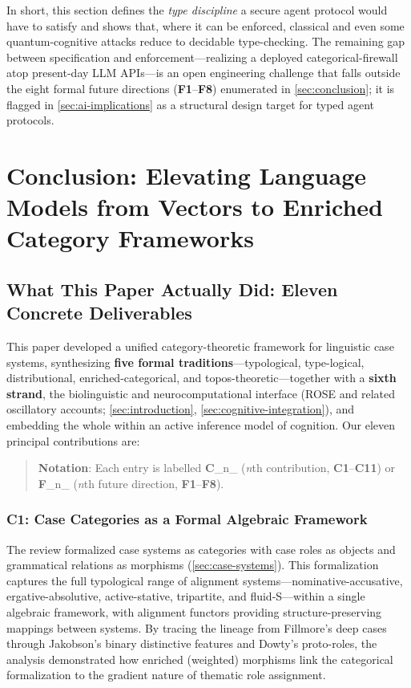 \documentclass[
]{article}
\begin{document}
In short, this section defines the \emph{type discipline} a secure agent
protocol would have to satisfy and shows that, where it can be enforced,
classical and even some quantum-cognitive attacks reduce to decidable
type-checking. The remaining gap between specification and
enforcement---realizing a deployed categorical-firewall atop present-day
LLM APIs---is an open engineering challenge that falls outside the eight
formal future directions (\textbf{F1}--\textbf{F8}) enumerated in
\autoref{sec:conclusion}; it is flagged in \autoref{sec:ai-implications}
as a structural design target for typed agent protocols.

\newpage

\section{Conclusion: Elevating Language Models from Vectors to Enriched
Category Frameworks}\label{sec:conclusion}

\subsection{What This Paper Actually Did: Eleven Concrete
Deliverables}\label{what-this-paper-actually-did-eleven-concrete-deliverables}

This paper developed a unified category-theoretic framework for
linguistic case systems, synthesizing \textbf{five formal
traditions}---typological, type-logical, distributional,
enriched-categorical, and topos-theoretic---together with a
\textbf{sixth strand}, the biolinguistic and neurocomputational
interface (ROSE and related oscillatory accounts;
\autoref{sec:introduction}, \autoref{sec:cognitive-integration}), and
embedding the whole within an active inference model of cognition. Our
eleven principal contributions are:

\begin{quote}
\textbf{Notation}: Each entry is labelled \textbf{C}\_n\_ (\emph{n}th
contribution, \textbf{C1}--\textbf{C11}) or \textbf{F}\_n\_ (\emph{n}th
future direction, \textbf{F1}--\textbf{F8}).
\end{quote}

\subsubsection{C1: Case Categories as a Formal Algebraic
Framework}\label{c1-case-categories-as-a-formal-algebraic-framework}

The review formalized case systems as categories with case roles as
objects and grammatical relations as morphisms
(\autoref{sec:case-systems}). This formalization captures the full
typological range of alignment systems---nominative-accusative,
ergative-absolutive, active-stative, tripartite, and fluid-S---within a
single algebraic framework, with alignment functors providing
structure-preserving mappings between systems. By tracing the lineage
from Fillmore's \citeyearpar{fillmore1968case} deep cases through
Jakobson's binary distinctive features and Dowty's
\citeyearpar{dowty1991thematic} proto-roles, the analysis demonstrated
how enriched (weighted) morphisms link the categorical formalization to
the gradient nature of thematic role assignment.
\end{document}
